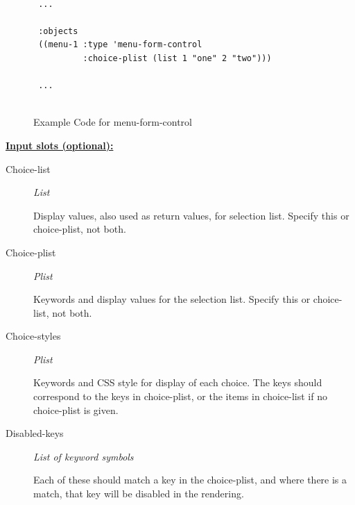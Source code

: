 \documentclass [11pt]{book}
\begin{document}
\begin{itemize}
\begin{figure}
\begin{lrbox}{\boxedverb}
\begin{minipage}{\linewidth}
{\small

\begin{verbatim}

 ...
 
 :objects
 ((menu-1 :type 'menu-form-control
          :choice-plist (list 1 "one" 2 "two")))

 ...


\end{verbatim}}
\end{minipage}
\end{lrbox}
\fbox{\usebox{\boxedverb}}

\caption{Example Code for menu-form-control}

\label{fig:example-code-menu-form-control}

\end{figure}





\textbf{
\underline{Input slots (optional):}}

\begin{description}

\item [Choice-list]
\emph{List}

 Display values, also used as return values, for selection list. Specify this or choice-plist, not both.




\item [Choice-plist]
\emph{Plist}

 Keywords and display values for the selection list. Specify this or choice-list, not both.




\item [Choice-styles]
\emph{Plist}

 Keywords and CSS style for display of each choice. The keys should correspond to the
keys in choice-plist, or the items in choice-list if no choice-plist is given.




\item [Disabled-keys]
\emph{List of keyword symbols}

 Each of these should match a key in the choice-plist, and where there is a
match, that key will be disabled in the rendering.





\end{description}
\end{itemize}
\end{document}
